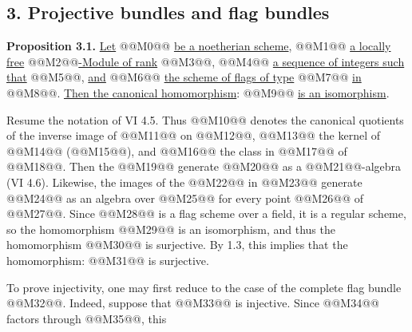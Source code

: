 
\subsection*{3. Projective bundles and flag bundles}

\textbf{Proposition 3.1.} \uline{Let} @@M0@@ \uline{be a noetherian scheme}, @@M1@@ \uline{a locally free} @@M2@@\uline{-Module of rank} @@M3@@, @@M4@@ \uline{a sequence of integers such that} @@M5@@, \uline{and} @@M6@@ \uline{the scheme of flags of type} @@M7@@ \uline{in} @@M8@@. \uline{Then the canonical homomorphism}:
@@M9@@
\uline{is an isomorphism}.

Resume the notation of VI 4.5. Thus @@M10@@ denotes the canonical quotients of the inverse image of @@M11@@ on @@M12@@, @@M13@@ the kernel of @@M14@@ (@@M15@@), and @@M16@@ the class in @@M17@@ of @@M18@@. Then the @@M19@@ generate @@M20@@ as a @@M21@@-algebra (VI 4.6). Likewise, the images of the @@M22@@ in @@M23@@ generate @@M24@@ as an algebra over @@M25@@ for every point @@M26@@ of @@M27@@. Since @@M28@@ is a flag scheme over a field, it is a regular scheme, so the homomorphism @@M29@@ is an isomorphism, and thus the homomorphism @@M30@@ is surjective. By 1.3, this implies that the homomorphism:
@@M31@@
is surjective.

To prove injectivity, one may first reduce to the case of the complete flag bundle @@M32@@. Indeed, suppose that
@@M33@@
is injective. Since @@M34@@ factors through @@M35@@, this

